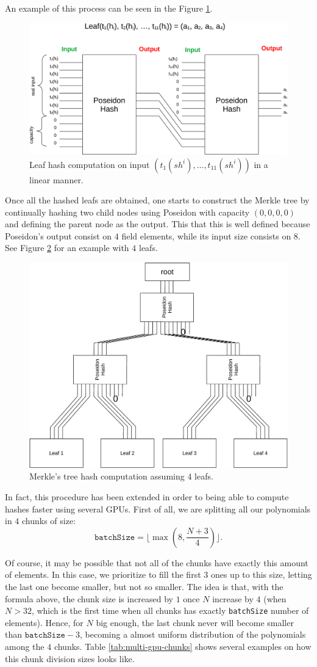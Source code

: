 An example of this process can be seen in the Figure \ref{fig:linear-hash}.
\begin{figure}[H]
	\centering
	\includegraphics[width=.7\textwidth]{../figures/poseidon-linear-hash}
	\caption{Leaf hash computation on input $(t_1(sh^i), \dots, t_{11}(sh^i))$ in a linear manner.}
	\label{fig:linear-hash}
\end{figure}

Once all the hashed leafs are obtained, one starts to construct the Merkle tree by continually hashing two child nodes using Poseidon with capacity $(0,0,0,0)$ and defining the parent node as the output. This that this is well defined because Poseidon's output consist on $4$ field elements, while its input size consists on $8$. See Figure \ref{fig:full-poseidon} for an example with $4$ leafs.
\begin{figure}[H]
	\centering
	\includegraphics[width=.6\textwidth]{../figures/MT-poseidon-example}
	\caption{Merkle's tree hash computation assuming $4$ leafs.}
	\label{fig:full-poseidon}
\end{figure}

In fact, this procedure has been extended in order to being able to compute hashes faster using several GPUs. First of all, we are splitting all our polynomials in $4$ chunks of size:
\[
\mathtt{batchSize} = \Biggl\lfloor \max \left( 8, \frac{N + 3}{4} \right)  \Biggr\rfloor.
\]

Of course, it may be possible that not all of the chunks have exactly this amount of elements. In this case, we prioritize to fill the first $3$ ones up to this size, letting the last one become smaller, but not so smaller. The idea is that, with the formula above, the chunk size is increased by $1$ once $N$ increase by $4$ (when $N > 32$, which is the first time when all chunks has exactly \texttt{batchSize} number of elements). Hence, for $N$ big enough, the last chunk never will become smaller than $\mathtt{batchSize} - 3$, becoming a almost uniform distribution of the polynomials among the $4$ chunks. Table \ref{tab:multi-gpu-chunks} shows several examples on how this chunk division sizes looks like.

